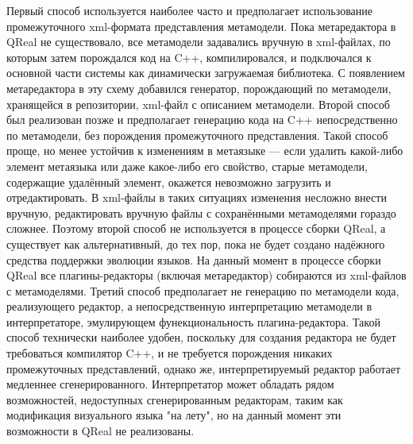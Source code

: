 \documentclass[a4paper]{article}
\begin{document}
Первый способ используется наиболее часто и предполагает использование промежуточного xml-формата представления метамодели. Пока метаредактора в QReal не существовало, все метамодели задавались вручную в xml-файлах, по которым затем порождался код на C++, компилировался, и подключался к основной части системы как динамически загружаемая библиотека. С появлением метаредактора в эту схему добавился генератор, порождающий по метамодели, хранящейся в репозитории, xml-файл с описанием метамодели. Второй способ был реализован позже и предполагает генерацию кода на C++ непосредственно по метамодели, без порождения промежуточного представления. Такой способ проще, но менее устойчив к изменениям в метаязыке --- если удалить какой-либо элемент метаязыка или даже какое-либо его свойство, старые метамодели, содержащие удалённый элемент, окажется невозможно загрузить и отредактировать. В xml-файлы в таких ситуациях изменения несложно внести вручную, редактировать вручную файлы с сохранёнными метамоделями гораздо сложнее. Поэтому второй способ не используется в процессе сборки QReal, а существует как альтернативный, до тех пор, пока не будет создано надёжного средства поддержки эволюции языков. На данный момент в процессе сборки QReal все плагины-редакторы (включая метаредактор) собираются из xml-файлов с метамоделями. Третий способ предполагает не генерацию по метамодели кода, реализующего редактор, а непосредственную интерпретацию метамодели в интерпретаторе, эмулирующем фунекциональность плагина-редактора. Такой способ технически наиболее удобен, поскольку для создания редактора не будет требоваться компилятор C++, и не требуется порождения никаких промежуточных представлений, однако же, интерпретируемый редактор работает медленнее сгенерированного. Интерпретатор может обладать рядом возможностей, недоступных сгенерированным редакторам, таким как модификация визуального языка "на лету", но на данный момент эти возможности в QReal не реализованы.
\end{document}
